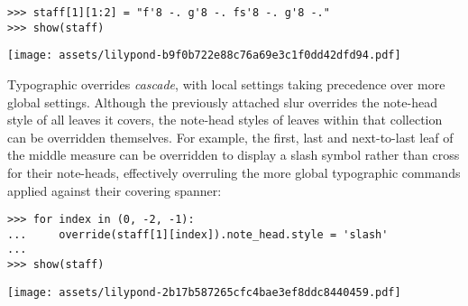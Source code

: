 \begin{comment}
<abjad>
staff[1][1:2] = "f'8 -. g'8 -. fs'8 -. g'8 -."
show(staff)
</abjad>
\end{comment}

\begin{abjadbookoutput}
\begin{singlespacing}
\vspace{-0.5\baselineskip}
\begin{verbatim}
>>> staff[1][1:2] = "f'8 -. g'8 -. fs'8 -. g'8 -."
>>> show(staff)
\end{verbatim}
\noindent\texttt{[image: assets/lilypond-b9f0b722e88c76a69e3c1f0dd42dfd94.pdf]}
\end{singlespacing}
\end{abjadbookoutput}

\noindent Typographic overrides \emph{cascade}, with local settings taking
precedence over more global settings. Although the previously attached slur
overrides the note-head style of all leaves it covers, the note-head styles of
leaves within that collection can be overridden themselves. For example, the
first, last and next-to-last leaf of the middle measure can be overridden to
display a slash symbol rather than cross for their note-heads, effectively
overruling the more global typographic commands applied against their covering
spanner:

\begin{comment}
<abjad>
for index in (0, -2, -1):
    override(staff[1][index]).note_head.style = 'slash'

show(staff)
</abjad>
\end{comment}

\begin{abjadbookoutput}
\begin{singlespacing}
\vspace{-0.5\baselineskip}
\begin{verbatim}
>>> for index in (0, -2, -1):
...     override(staff[1][index]).note_head.style = 'slash'
...
>>> show(staff)
\end{verbatim}
\noindent\texttt{[image: assets/lilypond-2b17b587265cfc4bae3ef8ddc8440459.pdf]}
\end{singlespacing}
\end{abjadbookoutput}


